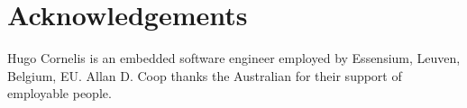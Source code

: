 \documentclass{article}
\begin{document}

\section*{Acknowledgements}

Hugo Cornelis is an embedded software engineer employed by Essensium, Leuven, Belgium, EU.
Allan D. Coop thanks the Australian
for their support of employable people.




\end{document}
